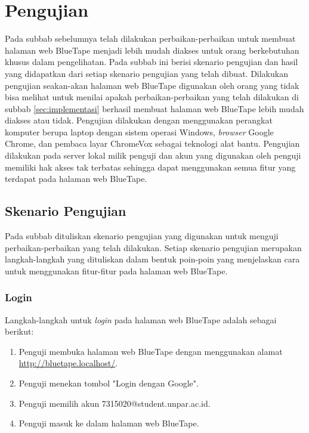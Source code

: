 \section{Pengujian}
\label{sec:pengujian}
Pada subbab sebelumnya telah dilakukan perbaikan-perbaikan untuk membuat halaman web BlueTape menjadi lebih mudah diakses untuk orang berkebutuhan khusus dalam pengelihatan. Pada subbab ini berisi skenario pengujian dan hasil yang didapatkan dari setiap skenario pengujian yang telah dibuat. Dilakukan pengujian seakan-akan halaman web BlueTape digunakan oleh orang yang tidak bisa melihat untuk menilai apakah perbaikan-perbaikan yang telah dilakukan di subbab \ref{sec:implementasi} berhasil membuat halaman web BlueTape lebih mudah diakses atau tidak. Pengujian dilakukan dengan menggunakan perangkat komputer berupa laptop dengan sistem operasi Windows, \textit{browser} Google Chrome, dan pembaca layar ChromeVox sebagai teknologi alat bantu. Pengujian dilakukan pada server lokal milik penguji dan akun yang digunakan oleh penguji memiliki hak akses tak terbatas sehingga dapat menggunakan semua fitur yang terdapat pada halaman web BlueTape.

\subsection{Skenario Pengujian}
\label{subsec:skenario_pengujian}
Pada subbab dituliskan skenario pengujian yang digunakan untuk menguji perbaikan-perbaikan yang telah dilakukan. Setiap skenario pengujian merupakan langkah-langkah yang dituliskan dalam bentuk poin-poin yang menjelaskan cara untuk menggunakan fitur-fitur pada halaman web BlueTape.

\subsubsection{Login}
\label{subsubsec:skenario_login}
Langkah-langkah untuk \textit{login} pada halaman web BlueTape adalah sebagai berikut:

\begin{enumerate}
    \item Penguji membuka halaman web BlueTape dengan menggunakan alamat \url{http://bluetape.localhost/}.
    \item Penguji menekan tombol "Login dengan Google".
    \item Penguji memilih akun 7315020@student.unpar.ac.id.
    \item Penguji masuk ke dalam halaman web BlueTape.
\end{enumerate}

